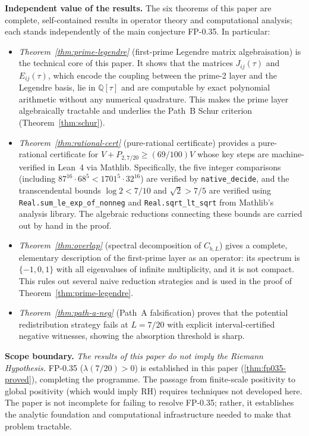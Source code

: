 \documentclass[12pt,a4paper]{amsart}
\theoremstyle{plain}
\theoremstyle{definition}
\begin{document}
\medskip
\textbf{Independent value of the results.}
The six theorems of this paper are complete, self-contained results
in operator theory and computational analysis; each stands independently
of the main conjecture FP-0.35.
In particular:
\begin{itemize}[leftmargin=2em]
\item \emph{Theorem~\ref{thm:prime-legendre}}
  (first-prime Legendre matrix algebraisation) is the technical core of this
  paper. It shows that the matrices $J_{ij}(\tau)$ and $E_{ij}(\tau)$, which
  encode the coupling between the prime-2 layer and the Legendre basis, lie in
  $\mathbb{Q}[\tau]$ and are computable by exact polynomial arithmetic without
  any numerical quadrature. This makes the prime layer algebraically tractable
  and underlies the Path~B Schur criterion (Theorem~\ref{thm:schur}).
\item \emph{Theorem~\ref{thm:rational-cert}} (pure-rational certificate)
  provides a pure-rational certificate for $V + P_{2,7/20} \ge (69/100)V$
  whose key steps are machine-verified in Lean~4 via Mathlib. Specifically,
  the five integer comparisons (including $87^{16} \cdot 68^5 < 1701^5 \cdot 32^{16}$)
  are verified by \texttt{native\_decide}, and the transcendental bounds
  $\log 2 < 7/10$ and $\sqrt{2} > 7/5$ are verified using
  \texttt{Real.sum\_le\_exp\_of\_nonneg} and \texttt{Real.sqrt\_lt\_sqrt}
  from Mathlib's analysis library. The algebraic reductions connecting these
  bounds are carried out by hand in the proof.
\item \emph{Theorem~\ref{thm:overlap}} (spectral decomposition of $C_{b,L}$)
  gives a complete, elementary description of the first-prime layer as an
  operator: its spectrum is $\{-1,0,1\}$ with all eigenvalues of infinite
  multiplicity, and it is not compact. This rules out several naive reduction
  strategies and is used in the proof of Theorem~\ref{thm:prime-legendre}.
\item \emph{Theorem~\ref{thm:path-a-neg}} (Path~A falsification)
  proves that the potential redistribution strategy fails at $L = 7/20$ with
  explicit interval-certified negative witnesses, showing the absorption
  threshold is sharp.
\end{itemize}

\medskip
\textbf{Scope boundary.}
\emph{The results of this paper do not imply the Riemann Hypothesis.}
FP-0.35 ($\lambda(7/20) > 0$) is established in this paper
(\cref{thm:fp035-proved}), completing the programme.
The passage from finite-scale positivity to global positivity (which would
imply RH) requires techniques not developed here.
The paper is not incomplete for failing to resolve FP-0.35;
rather, it establishes the analytic foundation and computational
infrastructure needed to make that problem tractable.
\end{document}
